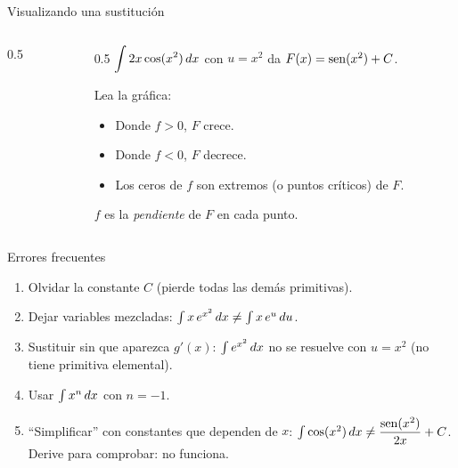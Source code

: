 \documentclass[10pt,aspectratio=169]{beamer}
\begin{document}
\begin{frame}{Visualizando una sustitución}
  \begin{columns}
    \begin{column}{0.5\textwidth}
      \centering
    \end{column}
    \begin{column}{0.5\textwidth}
      $\displaystyle\int 2x\cos(x^2)\,dx$ con $u=x^2$ da $F(x)=\operatorname{sen}(x^2)+C$.
      \vspace{2mm}

      Lea la gráfica:
      \begin{itemize}
        \item Donde $f>0$, $F$ crece.
        \item Donde $f<0$, $F$ decrece.
        \item Los ceros de $f$ son extremos (o puntos críticos) de $F$.
      \end{itemize}
      \begin{idea}
        $f$ es la \emph{pendiente} de $F$ en cada punto.
      \end{idea}
    \end{column}
  \end{columns}
\end{frame}

\begin{frame}{Errores frecuentes}
  \begin{enumerate}
    \item Olvidar la constante $C$ \quad (pierde todas las demás primitivas).
    \item Dejar variables mezcladas: $\int x\,e^{x^2}\,dx \neq \int x\,e^{u}\,du$.
    \item Sustituir sin que aparezca $g'(x)$:
      $\int e^{x^2}\,dx$ \alert{no} se resuelve con $u=x^2$ (no tiene primitiva elemental).
    \item Usar $\int x^n\,dx$ con $n=-1$.
    \item ``Simplificar'' con constantes que dependen de $x$:
      $\int \cos(x^2)\,dx \neq \dfrac{\operatorname{sen}(x^2)}{2x}+C$.
      Derive para comprobar: \alert{no} funciona.
  \end{enumerate}
\end{frame}
\end{document}
